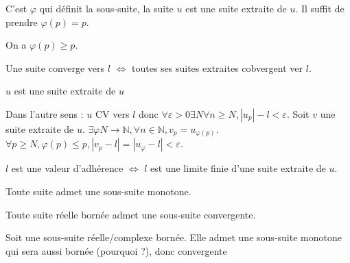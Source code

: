 \documentclass[french]{yLectureNote}
\newcommand{\N}[0]{\mathbb{N}}
\begin{document}
C'est $\varphi$ qui définit la sous-suite, la suite $u$ est une suite extraite de $u$. Il suffit de prendre $\varphi(p) = p$.
\begin{proposition}
On a $\varphi(p) \geq p$.
\end{proposition}
\begin{myproof}
\end{myproof}
\begin{proposition}
Une suite converge vers $l$ $\iff$ toutes ses suites extraites cobvergent ver $l$.
\end{proposition}
\begin{myproof}
$u$ est une suite extraite de $u$

Dans l'autre sens : $u$ CV vers $l$ donc $\forall \varepsilon >0\exists N\forall n\geq N, |u_p|-l<\varepsilon$. Soit $v$ une suite extraite de $u$. $\exists \varphi N\to\N, \forall n\in\N, v_p = u_{\varphi(p)}$. $\forall p\geq N,\varphi(p) \leq p, |v_p-l| = |u_{\varphi}-l| <\varepsilon$.
\end{myproof}
\begin{definition}
$l$ est une valeur d'adhérence $\iff$ $l$ est une limite finie d'une suite extraite de $u$.
\end{definition}
\begin{proposition}
Toute suite admet une sous-suite monotone.
\end{proposition}
\begin{theorem}
 Toute suite réelle bornée admet une sous-suite convergente.
\end{theorem}
\begin{myproof}
Soit une sous-suite réelle/complexe bornée. Elle admet une sous-suite monotone qui sera aussi bornée (pourquoi ?), donc convergente
\end{myproof}
\end{document}

